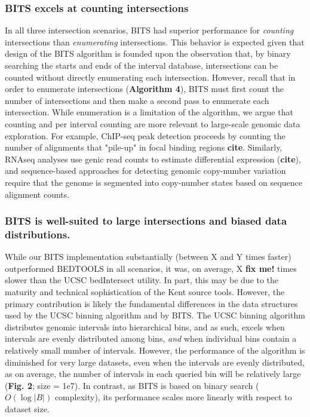 \documentclass{bioinfo}
\begin{document}
        \subsubsection{BITS excels at counting intersections}
        In all three intersection scenarios, BITS had superior performance for \emph{counting} intersections
        than \emph{enumerating} intersections. This behavior is expected given that design of the BITS algorithm
        is founded upon the observation that, by binary searching the starts and ends of the interval database, 
        intersections can be counted without directly enumerating each intersection. However, recall that in order to enumerate
        intersections (\textbf{Algorithm 4}), BITS must first count the number of intersections and then make 
        a second pass to enumerate each intersection. While enumeration is a limitation of the algorithm, 
        we argue that counting and per interval counting are more relevant to large-scale genomic data exploration. 
        For example, ChIP-seq peak detection proceeds by counting the number of alignments that "pile-up" in focal binding regions \textbf{cite}.
        Similarly, RNAseq analyses use genic read counts to estimate differential expression (\textbf{cite}), and sequence-based 
        approaches for detecting genomic copy-number variation require that the genome is segmented into copy-number states based
        on sequence alignment counts.

        
        \subsubsection{BITS is well-suited to large intersections and biased data distributions.}
        While our BITS implementation substantially (between X and Y times faster) outperformed BEDTOOLS 
        in all scenarios, it was, on average, X \textbf{fix me!} times slower than the UCSC bedIntersect utility. 
        In part, this may be due to the maturity and technical sophistication of the Kent source tools. However, the
        primary contribution is likely the fundamental differences in the data structures used by
        the UCSC binning algorithm and by BITS.  The UCSC binning algorithm distributes genomic intervals
        into hierarchical bins, and as such, excels when intervals are evenly distributed among bins, \emph{and}
        when individual bins contain a relatively small number of intervals.  However, the performance of the algorithm
        is diminished for very large datasets, even when the intervals are evenly distributed, as on average, the number
        of intervals in each queried bin will be relatively large (\textbf{Fig. 2}; size = 1e7). In contrast, as BITS is based on
        binary search ($O(\log |B|)$ complexity), its performance scales more linearly with respect to dataset size.
\end{document}
